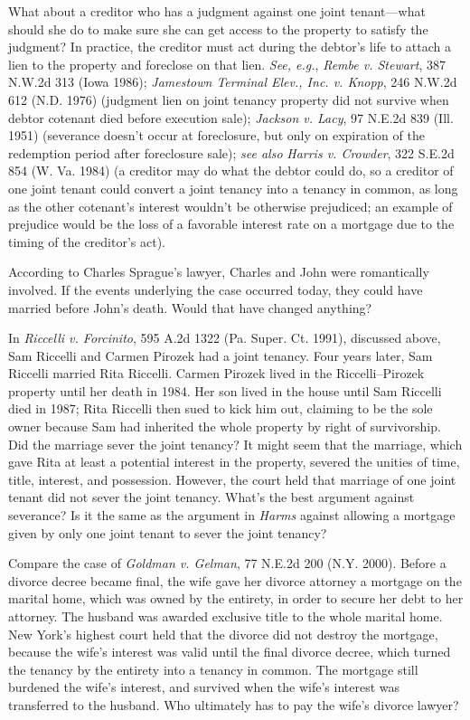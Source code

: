 What about a creditor who has a judgment against one joint tenant---what should
she do to make sure she can get access to the property to satisfy the judgment?
In practice, the creditor must act during the debtor's life to attach a lien to
the property and foreclose on that lien. \textit{See, e.g.}, \emph{Rembe v.
Stewart}, 387 N.W.2d 313 (Iowa 1986); \emph{Jamestown Terminal Elev., Inc. v.
Knopp}, 246 N.W.2d 612 (N.D. 1976) (judgment lien on joint tenancy property did
not survive when debtor cotenant died before execution sale); \emph{Jackson v.
Lacy}, 97 N.E.2d 839 (Ill. 1951) (severance doesn't occur at foreclosure, but
only on expiration of the redemption period after foreclosure sale); \textit{see
also} \emph{Harris v. Crowder}, 322 S.E.2d 854 (W. Va. 1984) (a creditor may do
what the debtor could do, so a creditor of one joint tenant could convert a
joint tenancy into a tenancy in common, as long as the other cotenant's interest
wouldn't be otherwise prejudiced; an example of prejudice would be the loss of a
favorable interest rate on a mortgage due to the timing of the creditor's act).



\item According to Charles Sprague's lawyer, Charles and John were romantically
involved. If the events underlying the case occurred today, they could have
married before John's death. Would that have changed anything?


In \emph{Riccelli v. Forcinito}, 595 A.2d 1322 (Pa. Super. Ct. 1991), discussed
above, Sam Riccelli and Carmen Pirozek had a joint tenancy. Four years later,
Sam Riccelli married Rita Riccelli. Carmen Pirozek lived in the
Riccelli--Pirozek
property until her death in 1984. Her son lived in the house until Sam Riccelli
died in 1987; Rita Riccelli then sued to kick him out, claiming to be the sole
owner because Sam had inherited the whole property by right of survivorship. Did
the marriage sever the joint tenancy? It might seem that the marriage, which
gave Rita at least a potential interest in the property, severed the unities of
time, title, interest, and possession. However, the court held that marriage of
one joint tenant did not sever the joint tenancy. What's the best argument
against severance? Is it the same as the argument in \textit{Harms} against
allowing a mortgage given by only one joint tenant to sever the joint tenancy?



Compare the case of \textit{Goldman v. Gelman}, 77 N.E.2d 200 (N.Y. 2000).
Before a divorce decree became final, the wife gave her divorce attorney a
mortgage on the marital home, which was owned by the entirety, in order to
secure her debt to her attorney. The husband was awarded exclusive title to
the whole marital home. New York's highest court held that the divorce did not
destroy the mortgage, because the wife's interest was valid until the final
divorce decree, which turned the tenancy by the entirety into a tenancy in
common. The mortgage still burdened the wife's interest, and survived when the
wife's interest was transferred to the husband. Who ultimately has to pay the
wife's divorce lawyer?



